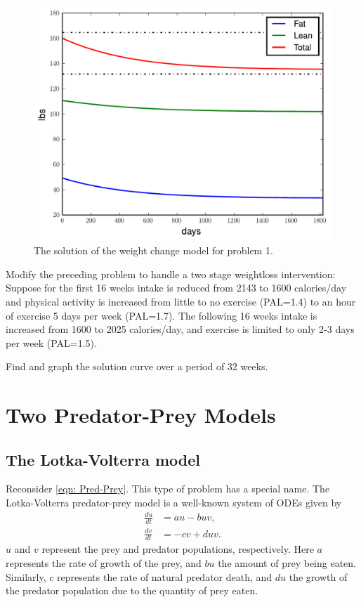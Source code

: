 \begin{figure}
\centering
\includegraphics[width=\textwidth]{weightloss_graph.pdf}
\caption{The solution of the weight change model for problem 1.}
\label{fig:weightloss}
\end{figure}

\begin{problem}
Modify the preceding problem to handle a two stage weightloss intervention:
Suppose for the first 16 weeks intake is reduced from 2143 to 1600 calories/day and physical activity is increased from little to no exercise (PAL=1.4) to an hour of exercise 5 days per week (PAL=1.7).
The following 16 weeks intake is increased from 1600 to 2025 calories/day, and exercise is limited to only 2-3 days per week (PAL=1.5).

Find and graph the solution curve over a period of 32 weeks.
\end{problem}

\section*{Two Predator-Prey Models}
\subsection*{The Lotka-Volterra model}
Reconsider \eqref{eqn: Pred-Prey}.
This type of problem has a special name.
The Lotka-Volterra predator-prey model is a well-known
system of ODEs given by
\begin{align*}
	\frac{du}{dt} &= au - buv,\\
	\frac{dv}{dt} &= -cv + duv.
\end{align*}
$u$ and $v$ represent the prey and predator populations, respectively. Here $a$ represents the rate of growth of the prey, and $bu$ the amount of prey being eaten.
Similarly, $c$ represents the rate of natural predator death, and $du$ the growth of the predator population due to the quantity of prey eaten.

